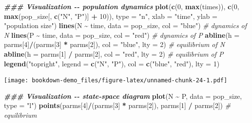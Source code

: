 \documentclass[
]{book}
\newenvironment{Shaded}{\begin{snugshade}}{\end{snugshade}}
\newcommand{\AttributeTok}[1]{\textcolor[rgb]{0.13,0.29,0.53}{#1}}
\newcommand{\CommentTok}[1]{\textcolor[rgb]{0.56,0.35,0.01}{\textit{#1}}}
\newcommand{\DecValTok}[1]{\textcolor[rgb]{0.00,0.00,0.81}{#1}}
\newcommand{\DocumentationTok}[1]{\textcolor[rgb]{0.56,0.35,0.01}{\textbf{\textit{#1}}}}
\newcommand{\FunctionTok}[1]{\textcolor[rgb]{0.13,0.29,0.53}{\textbf{#1}}}
\newcommand{\NormalTok}[1]{#1}
\newcommand{\SpecialCharTok}[1]{\textcolor[rgb]{0.81,0.36,0.00}{\textbf{#1}}}
\newcommand{\StringTok}[1]{\textcolor[rgb]{0.31,0.60,0.02}{#1}}
\begin{document}
\begin{Shaded}
\begin{Highlighting}[]
\DocumentationTok{\#\#\# Visualization {-}{-} population dynamics}
\FunctionTok{plot}\NormalTok{(}\FunctionTok{c}\NormalTok{(}\DecValTok{0}\NormalTok{, }\FunctionTok{max}\NormalTok{(times)), }\FunctionTok{c}\NormalTok{(}\DecValTok{0}\NormalTok{, }\FunctionTok{max}\NormalTok{(pop\_size[, }\FunctionTok{c}\NormalTok{(}\StringTok{"N"}\NormalTok{, }\StringTok{"P"}\NormalTok{)] }\SpecialCharTok{+} \DecValTok{10}\NormalTok{)), }\AttributeTok{type =} \StringTok{"n"}\NormalTok{, }\AttributeTok{xlab =} \StringTok{"time"}\NormalTok{, }\AttributeTok{ylab =} \StringTok{"population size"}\NormalTok{)}
\FunctionTok{lines}\NormalTok{(N }\SpecialCharTok{\textasciitilde{}}\NormalTok{ time, }\AttributeTok{data =}\NormalTok{ pop\_size, }\AttributeTok{col =} \StringTok{"blue"}\NormalTok{) }\CommentTok{\# dynamics of N}
\FunctionTok{lines}\NormalTok{(P }\SpecialCharTok{\textasciitilde{}}\NormalTok{ time, }\AttributeTok{data =}\NormalTok{ pop\_size, }\AttributeTok{col =} \StringTok{"red"}\NormalTok{) }\CommentTok{\# dynamics of P}
\FunctionTok{abline}\NormalTok{(}\AttributeTok{h =}\NormalTok{ parms[}\DecValTok{4}\NormalTok{]}\SpecialCharTok{/}\NormalTok{(parms[}\DecValTok{3}\NormalTok{] }\SpecialCharTok{*}\NormalTok{ parms[}\DecValTok{2}\NormalTok{]), }\AttributeTok{col =} \StringTok{"blue"}\NormalTok{, }\AttributeTok{lty =} \DecValTok{2}\NormalTok{) }\CommentTok{\# equilibrium of N}
\FunctionTok{abline}\NormalTok{(}\AttributeTok{h =}\NormalTok{ parms[}\DecValTok{1}\NormalTok{] }\SpecialCharTok{/}\NormalTok{ parms[}\DecValTok{2}\NormalTok{], }\AttributeTok{col =} \StringTok{"red"}\NormalTok{, }\AttributeTok{lty =} \DecValTok{2}\NormalTok{) }\CommentTok{\# equilibrium of P}
\FunctionTok{legend}\NormalTok{(}\StringTok{"topright"}\NormalTok{, }\AttributeTok{legend =} \FunctionTok{c}\NormalTok{(}\StringTok{"N"}\NormalTok{, }\StringTok{"P"}\NormalTok{), }\AttributeTok{col =} \FunctionTok{c}\NormalTok{(}\StringTok{"blue"}\NormalTok{, }\StringTok{"red"}\NormalTok{), }\AttributeTok{lty =} \DecValTok{1}\NormalTok{)}
\end{Highlighting}
\end{Shaded}

\texttt{[image: bookdown-demo\_files/figure-latex/unnamed-chunk-24-1.pdf]}

\begin{Shaded}
\begin{Highlighting}[]
\DocumentationTok{\#\#\# Visualization {-}{-} state{-}space diagram}
\FunctionTok{plot}\NormalTok{(N }\SpecialCharTok{\textasciitilde{}}\NormalTok{ P, }\AttributeTok{data =}\NormalTok{ pop\_size, }\AttributeTok{type =} \StringTok{"l"}\NormalTok{)}
\FunctionTok{points}\NormalTok{(parms[}\DecValTok{4}\NormalTok{]}\SpecialCharTok{/}\NormalTok{(parms[}\DecValTok{3}\NormalTok{] }\SpecialCharTok{*}\NormalTok{ parms[}\DecValTok{2}\NormalTok{]), parms[}\DecValTok{1}\NormalTok{] }\SpecialCharTok{/}\NormalTok{ parms[}\DecValTok{2}\NormalTok{]) }\CommentTok{\# equilibrium}
\end{Highlighting}
\end{Shaded}
\end{document}
